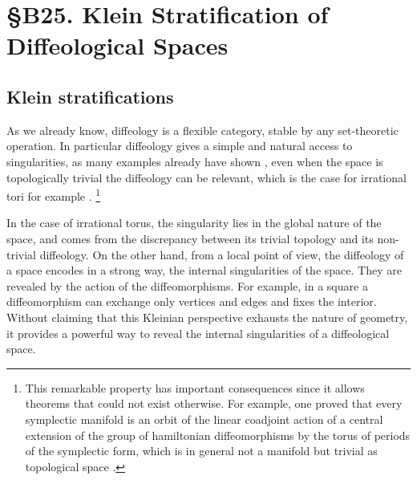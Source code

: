 

\chapter*{\S B25. Klein Stratification of Diffeological Spaces}
\setcounter{footnote}{0}


\begin{abstract}
  In this note we see that every diffeological space is naturally stratified by the action of its diffeomorphisms.
\end{abstract}

\section{Klein stratifications}

As we already know,
diffeology is a flexible category,
stable by any set-theoretic operation.
In particular diffeology gives a simple and natural access to singularities,
as many examples already have shown \cite{DI83, IKZ10, PIZ15},
even when the space is topologically trivial the diffeology can be relevant,
which is the case for irrational tori for example \cite{DI83}.%
\footnote{This remarkable property has important consequences since it allows theorems that could not exist otherwise.
For example,
one proved that every symplectic manifold is an orbit of the linear coadjoint action of a central extension of the group of hamiltonian diffeomorphisms by the torus of periods of the symplectic form,
which is in general not a manifold but trivial as topological space \cite{DIZ22}.}

In the case of irrational torus,
the singularity lies in the global nature of the space,
and comes from the discrepancy between its trivial topology and its non-trivial diffeology.
On the other hand,
from a local point of view,
the diffeology of a space encodes in a strong way,
the internal singularities of the space.
They are revealed by the action of the diffeomorphisms.
For example,
in a square a diffeomorphism can exchange only vertices and edges and fixes the interior.
Without claiming that this Kleinian perspective exhausts the nature of geometry,
it provides a powerful way to reveal the internal singularities of a diffeological space.

